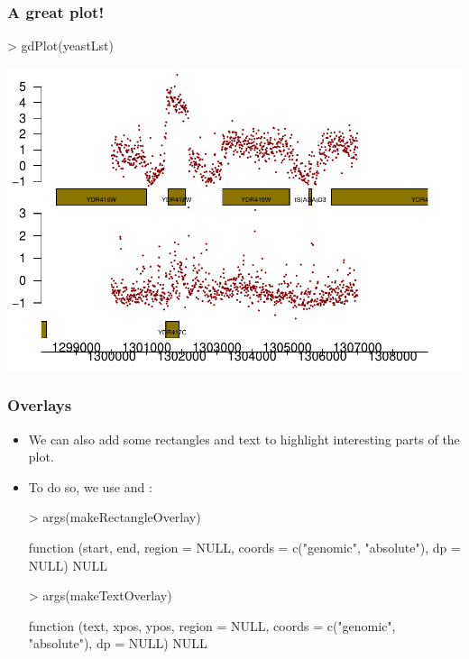 \begin{frame}
  \frametitle{A great plot!}
\begin{Schunk}
\begin{Sinput}
> gdPlot(yeastLst)
\end{Sinput}
\end{Schunk}
\includegraphics{plots/fig-034}
\end{frame}

\begin{frame}
  \frametitle{Overlays}
  \begin{itemize}
  \item We can also add some rectangles and text to highlight interesting parts of the plot.
  \item To do so, we use  and : \scriptsize
\begin{Schunk}
\begin{Sinput}
> args(makeRectangleOverlay)
\end{Sinput}
\begin{Soutput}
function (start, end, region = NULL, coords = c("genomic", "absolute"), 
    dp = NULL) 
NULL
\end{Soutput}
\begin{Sinput}
> args(makeTextOverlay)
\end{Sinput}
\begin{Soutput}
function (text, xpos, ypos, region = NULL, coords = c("genomic", 
    "absolute"), dp = NULL) 
NULL
\end{Soutput}
\end{Schunk}
\normalsize
  \end{itemize}
\end{frame}

